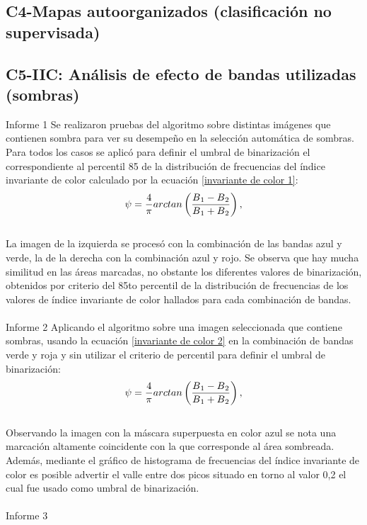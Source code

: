 \subsection{C4-Mapas autoorganizados (clasificación no supervisada)}
\subsection{C5-IIC: Análisis de efecto de bandas utilizadas (sombras)}
Informe 1
Se realizaron pruebas del algoritmo sobre distintas imágenes que contienen sombra para ver su desempeño en la selección automática de sombras. Para todos los casos se aplicó para definir el umbral de binarización el correspondiente al percentil 85 de la distribución de frecuencias del índice invariante de color calculado por la ecuación \ref{invariante de color 1}:
\\
\begin{equation}
	\psi=\frac{4}{\pi} arctan\left(\frac{B\textsubscript{1}-B\textsubscript{2}}{B\textsubscript{1}+B\textsubscript{2}}\right),\label{invariante de color 1}
\end{equation}
\\
La imagen de la izquierda se procesó con la combinación de las bandas azul y verde, la de la derecha con la combinación azul y rojo.
Se observa que hay mucha similitud en las áreas marcadas, no obstante los diferentes valores de binarización, obtenidos por criterio del 85to percentil de la distribución de frecuencias de los valores de índice invariante de color hallados para cada combinación de bandas.
\\
\\
Informe 2
Aplicando el algoritmo sobre una imagen seleccionada que contiene sombras, usando la ecuación \ref{invariante de color 2} en la combinación de bandas verde y roja y sin utilizar el criterio de percentil para definir el umbral de binarización:
\\
\begin{equation}
	\psi=\frac{4}{\pi} arctan\left(\frac{B\textsubscript{1}-B\textsubscript{2}}{B\textsubscript{1}+B\textsubscript{2}}\right),\label{invariante de color2}
\end{equation}
\\
Observando la imagen con la máscara superpuesta en color azul se nota una marcación altamente coincidente con la que corresponde al área sombreada. Además, mediante el gráfico de histograma de frecuencias del índice invariante de color es posible advertir el valle entre dos picos situado en torno al valor 0,2 el cual fue usado como umbral de binarización.
\\
\\
Informe 3

